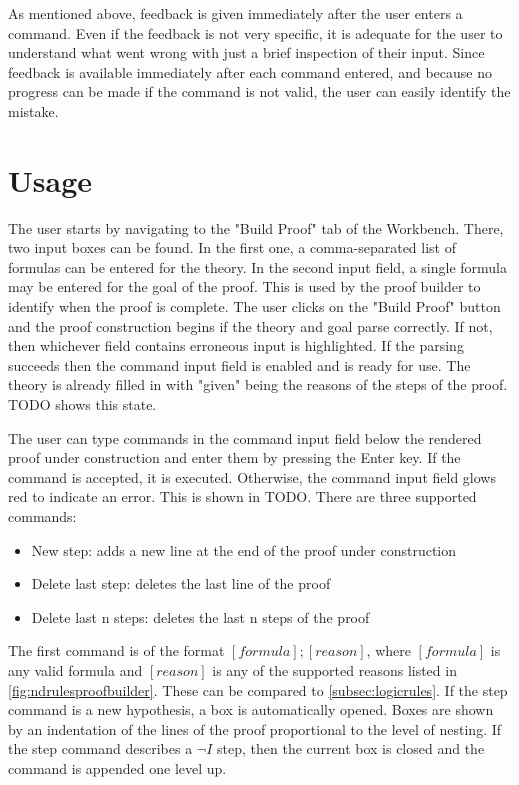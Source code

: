 \documentclass[11pt,twoside,a4paper]{report}
\begin{document}
As mentioned above, feedback is given immediately after the user enters a command. Even if the feedback is not very specific, it is adequate for the user to understand what went wrong with just a brief inspection of their input. Since feedback is available immediately after each command entered, and because no progress can be made if the command is not valid, the user can easily identify the mistake.

\section{Usage}
The user starts by navigating to the "Build Proof" tab of the Workbench. There, two input boxes can be found. In the first one, a comma-separated list of formulas can be entered for the theory. In the second input field, a single formula may be entered for the goal of the proof. This is used by the proof builder to identify when the proof is complete. The user clicks on the "Build Proof" button and the proof construction begins if the theory and goal parse correctly. If not, then whichever field contains erroneous input is highlighted. If the parsing succeeds then the command input field is enabled and is ready for use. The theory is already filled in with "given" being the reasons of the steps of the proof. TODO shows this state.

The user can type commands in the command input field below the rendered proof under construction and enter them by pressing the Enter key. If the command is accepted, it is executed. Otherwise, the command input field glows red to indicate an error. This is shown in TODO. There are three supported commands:

\begin{itemize}
\item
New step: adds a new line at the end of the proof under construction
\item
Delete last step: deletes the last line of the proof
\item
Delete last n steps: deletes the last n steps of the proof
\end{itemize}

The first command is of the format $[formula]; [reason]$, where $[formula]$ is any valid formula and $[reason]$ is any of the supported reasons listed in \autoref{fig:ndrulesproofbuilder}. These can be compared to \autoref{subsec:logicrules}. If the step command is a new hypothesis, a box is automatically opened. Boxes are shown by an indentation of the lines of the proof proportional to the level of nesting. If the step command describes a $\neg I$ step, then the current box is closed and the command is appended one level up.
\end{document}
